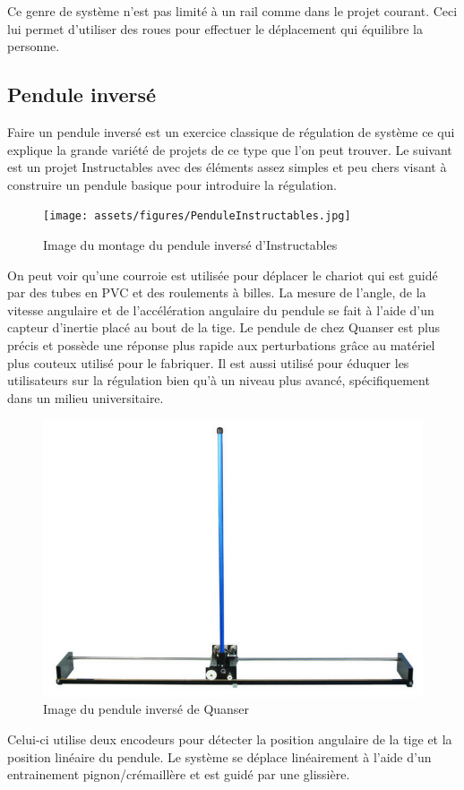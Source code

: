 Ce genre de système n'est pas limité à un rail comme dans le projet courant. Ceci lui permet d'utiliser des roues pour effectuer le déplacement qui équilibre la personne.

\subsection{Pendule inversé}

Faire un pendule inversé est un exercice classique de régulation de système ce qui explique la grande variété de projets de ce type que l'on peut trouver.
Le suivant est un projet Instructables avec des éléments assez simples et peu chers visant à construire un pendule basique pour introduire la régulation.

\begin{figure}[H]
    \centering
    \texttt{[image: assets/figures/PenduleInstructables.jpg]}
    \caption{Image du montage du pendule inversé d'Instructables \cite{Instructables}}
    \label{fig:Instructables}
\end{figure}

On peut voir qu'une courroie est utilisée pour déplacer le chariot qui est guidé par des tubes en PVC et des roulements à billes. La mesure de l'angle, de la vitesse angulaire et de l'accélération angulaire du pendule se fait à l'aide d'un capteur d'inertie placé au bout de la tige.
Le pendule de chez Quanser est plus précis et possède une réponse plus rapide aux perturbations grâce au matériel plus couteux utilisé pour le fabriquer. Il est aussi utilisé pour éduquer les utilisateurs sur la régulation bien qu'à un niveau plus avancé, spécifiquement dans un milieu universitaire.

\begin{figure}[H]
    \centering
    \includegraphics[width = \textwidth]{assets/figures/PenduleQuanser.png}
    \caption{Image du pendule inversé de Quanser \cite{Quanser}}
    \label{fig:Quanser}
\end{figure}

Celui-ci utilise deux encodeurs pour détecter la position angulaire de la tige et la position linéaire du pendule. Le système se déplace linéairement à l'aide d'un entrainement pignon/crémaillère et est guidé par une glissière.